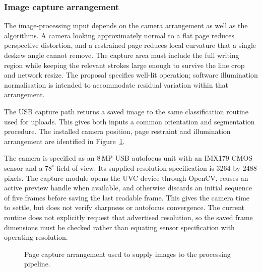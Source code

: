 \subsubsection{Image capture arrangement}
\label{sec:des-camera}
The image-processing input depends on the camera arrangement as well as the algorithms. A camera looking approximately normal to a flat page reduces perspective distortion, and a restrained page reduces local curvature that a single deskew angle cannot remove. The capture area must include the full writing region while keeping the relevant strokes large enough to survive the line crop and network resize. The proposal specifies well-lit operation; software illumination normalisation is intended to accommodate residual variation within that arrangement.~\cite[hardware clarifications]{brauneevidence2026}\cite[reproduce.py]{braunepipeline2026}


The USB capture path returns a saved image to the same classification routine used for uploads. This gives both inputs a common orientation and segmentation procedure. The installed camera position, page restraint and illumination arrangement are identified in Figure~\ref{fig:des-capture}.~\cite[hardware clarifications; reproduce.py]{brauneevidence2026,braunepipeline2026}

The camera is specified as an 8\,MP USB autofocus unit with an IMX179 CMOS sensor and a $78^\circ$ field of view. Its supplied resolution specification is 3264 by 2488 pixels. The capture module opens the UVC device through OpenCV, reuses an active preview handle when available, and otherwise discards an initial sequence of five frames before saving the last readable frame. This gives the camera time to settle, but does not verify sharpness or autofocus convergence. The current routine does not explicitly request that advertised resolution, so the saved frame dimensions must be checked rather than equating sensor specification with operating resolution.~\cite[hardware clarifications]{brauneevidence2026}


\begin{figure}[!htbp]\centering
{}
\caption{Page capture arrangement used to supply images to the processing pipeline.~\cite{brauneevidence2026,braunepipeline2026}}
\label{fig:des-capture}
\end{figure}


